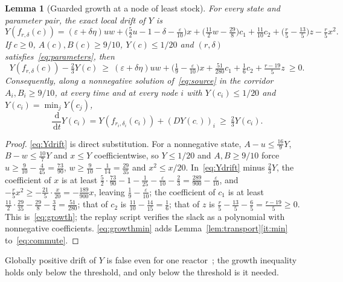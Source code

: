 \documentclass[11pt,a4paper]{article}
\theoremstyle{plain}
\newtheorem{lemma}[theorem]{Lemma}
\theoremstyle{definition}
\theoremstyle{remark}
\newcommand{\eps}{\varepsilon}
\newcommand{\dd}{\,\mathrm d}
\newcommand{\Dop}{D}
\begin{document}
\begin{lemma}[Guarded growth at a node of least stock]\label{lem:growth}
For every state and parameter pair, the exact local drift of $Y$ is
\begin{equation}\label{eq:Ydrift}
Y(f_{r,\delta}(c))=(\eps+\delta\eta)uw+\bigl(\tfrac52u-1-\delta-\tfrac{\eps}{10}\bigr)x+\bigl(\tfrac{11}2w-\tfrac{29}8\bigr)c_1+\tfrac{11}{10}c_2+\bigl(\tfrac r5-\tfrac{13}5\bigr)z-\tfrac r5x^2 .
\end{equation}
If $c\ge0$, $A(c),B(c)\ge9/10$, $Y(c)\le1/20$ and $(r,\delta)$ satisfies~\eqref{eq:parameters}, then
\begin{equation}\label{eq:growth}
Y(f_{r,\delta}(c))-\tfrac23Y(c)\ \ge\ (\eps+\delta\eta)uw+\bigl(\tfrac19-\tfrac{\eps}{10}\bigr)x+\tfrac{51}{280}c_1+\tfrac16c_2+\tfrac{r-19}5z\ \ge0 .
\end{equation}
Consequently, along a nonnegative solution of~\eqref{eq:source} in the corridor $A_i,B_i\ge9/10$, at every time and at every node $i$ with $Y(c_i)\le1/20$ and $Y(c_i)=\min_jY(c_j)$,
\begin{equation}\label{eq:growthmin}
\frac{\dd}{\dd t}Y(c_i)=Y(f_{r_i,\delta_i}(c_i))+(\Dop Y(c_\cdot))_i\ \ge\ \tfrac23Y(c_i).
\end{equation}
\end{lemma}
\begin{proof}
\eqref{eq:Ydrift} is direct substitution. For a nonnegative state, $A-u\le\frac{16}9Y$, $B-w\le\frac{10}7Y$ and $x\le Y$ coefficientwise, so $Y\le1/20$ and $A,B\ge9/10$ force $u\ge\frac9{10}-\frac4{45}=\frac{73}{90}$, $w\ge\frac9{10}-\frac1{14}=\frac{29}{35}$ and $x^2\le x/20$. In~\eqref{eq:Ydrift} minus $\frac23Y$, the coefficient of $x$ is at least $\frac52\cdot\frac{73}{90}-1-\frac1{25}-\frac{\eps}{10}-\frac23=\frac{289}{900}-\frac{\eps}{10}$, and $-\frac r5x^2\ge-\frac{21}5\cdot\frac x{20}=-\frac{189}{900}x$, leaving $\frac19-\frac{\eps}{10}$; the coefficient of $c_1$ is at least $\frac{11}2\cdot\frac{29}{35}-\frac{29}8-\frac34=\frac{51}{280}$; that of $c_2$ is $\frac{11}{10}-\frac{14}{15}=\frac16$; that of $z$ is $\frac r5-\frac{13}5-\frac65=\frac{r-19}5\ge0$. This is~\eqref{eq:growth}; the replay script verifies the slack as a polynomial with nonnegative coefficients. \eqref{eq:growthmin} adds Lemma~\ref{lem:transport}\ref{it:min} to~\eqref{eq:commute}.
\end{proof}
Globally positive drift of $Y$ is false even for one reactor~\citep[Remark~4.7]{recovery2026}; the growth inequality holds only below the threshold, and only below the threshold is it needed.
\end{document}
